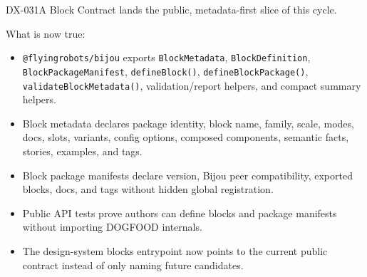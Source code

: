 DX-031A Block Contract lands the public, metadata-first slice of this cycle.

What is now true:

\begin{itemize}
\tightlist
\item
  \texttt{@\allowbreak{}f\allowbreak{}l\allowbreak{}y\allowbreak{}i\allowbreak{}n\allowbreak{}g\allowbreak{}r\allowbreak{}o\allowbreak{}b\allowbreak{}o\allowbreak{}t\allowbreak{}s\allowbreak{}/\allowbreak{}b\allowbreak{}i\allowbreak{}j\allowbreak{}o\allowbreak{}u} exports \texttt{B\allowbreak{}l\allowbreak{}o\allowbreak{}c\allowbreak{}k\allowbreak{}M\allowbreak{}e\allowbreak{}t\allowbreak{}a\allowbreak{}d\allowbreak{}a\allowbreak{}t\allowbreak{}a}, \texttt{B\allowbreak{}l\allowbreak{}o\allowbreak{}c\allowbreak{}k\allowbreak{}D\allowbreak{}e\allowbreak{}f\allowbreak{}i\allowbreak{}n\allowbreak{}i\allowbreak{}t\allowbreak{}i\allowbreak{}o\allowbreak{}n}, \texttt{B\allowbreak{}l\allowbreak{}o\allowbreak{}c\allowbreak{}k\allowbreak{}P\allowbreak{}a\allowbreak{}c\allowbreak{}k\allowbreak{}a\allowbreak{}g\allowbreak{}e\allowbreak{}M\allowbreak{}a\allowbreak{}n\allowbreak{}i\allowbreak{}f\allowbreak{}e\allowbreak{}s\allowbreak{}t}, \texttt{d\allowbreak{}e\allowbreak{}f\allowbreak{}i\allowbreak{}n\allowbreak{}e\allowbreak{}B\allowbreak{}l\allowbreak{}o\allowbreak{}c\allowbreak{}k\allowbreak{}(\allowbreak{})}, \texttt{d\allowbreak{}e\allowbreak{}f\allowbreak{}i\allowbreak{}n\allowbreak{}e\allowbreak{}B\allowbreak{}l\allowbreak{}o\allowbreak{}c\allowbreak{}k\allowbreak{}P\allowbreak{}a\allowbreak{}c\allowbreak{}k\allowbreak{}a\allowbreak{}g\allowbreak{}e\allowbreak{}(\allowbreak{})}, \texttt{v\allowbreak{}a\allowbreak{}l\allowbreak{}i\allowbreak{}d\allowbreak{}a\allowbreak{}t\allowbreak{}e\allowbreak{}B\allowbreak{}l\allowbreak{}o\allowbreak{}c\allowbreak{}k\allowbreak{}M\allowbreak{}e\allowbreak{}t\allowbreak{}a\allowbreak{}d\allowbreak{}a\allowbreak{}t\allowbreak{}a\allowbreak{}(\allowbreak{})}, validation/report helpers, and compact summary helpers.
\item
  Block metadata declares package identity, block name, family, scale, modes, docs, slots, variants, config options, composed components, semantic facts, stories, examples, and tags.
\item
  Block package manifests declare version, Bijou peer compatibility, exported blocks, docs, and tags without hidden global registration.
\item
  Public API tests prove authors can define blocks and package manifests without importing DOGFOOD internals.
\item
  The design-system blocks entrypoint now points to the current public contract instead of only naming future candidates.
\end{itemize}

